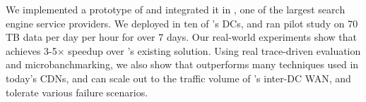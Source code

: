 We implemented a prototype of \name and integrated it in
\company, one of the largest search engine service
providers. We deployed \name in ten of \company's DCs, and
ran pilot study on 70 TB data per day per hour for over 7 days. Our
real-world experiments show that \name achieves 3-5$\times$
speedup over \company's existing solution.
Using real trace-driven evaluation and microbanchmarking,
we also show that \name outperforms many techniques used in
today's CDNs, and \name can scale out to the traffic volume
of \company's inter-DC WAN, and tolerate various failure
scenarios.
